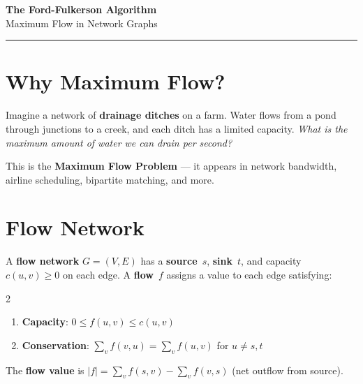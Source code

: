 \documentclass[10pt,a4paper]{article}
\begin{document}
\begin{center}
{\LARGE\bfseries\color{accent} The Ford-Fulkerson Algorithm}\\[3pt]
{\large\color{slate} Maximum Flow in Network Graphs}\\[2pt]
{\color{slate!60}\rule{0.4\textwidth}{0.4pt}}
\end{center}

\section{Why Maximum Flow?}

Imagine a network of \textbf{drainage ditches} on a farm. Water flows from a pond through junctions to a creek, and each ditch has a limited capacity. \textit{What is the maximum amount of water we can drain per second?}

This is the \textbf{Maximum Flow Problem} --- it appears in network bandwidth, airline scheduling, bipartite matching, and more.

\section{Flow Network}

\begin{defbox}[Definition]
A \textbf{flow network} $G=(V,E)$ has a \textbf{source}~$s$, \textbf{sink}~$t$, and capacity $c(u,v)\geq 0$ on each edge.
A \textbf{flow}~$f$ assigns a value to each edge satisfying:

\begin{multicols}{2}
\begin{enumerate}
  \item \textbf{Capacity}: $0 \leq f(u,v) \leq c(u,v)$
  \item \textbf{Conservation}: $\displaystyle\sum_v f(v,u) = \sum_v f(u,v)$\; for $u\neq s,t$
\end{enumerate}
\end{multicols}
\vspace{-4pt}
The \textbf{flow value} is $|f| = \sum_v f(s,v) - \sum_v f(v,s)$ (net outflow from source).
\end{defbox}

\vspace{4pt}
\end{document}
